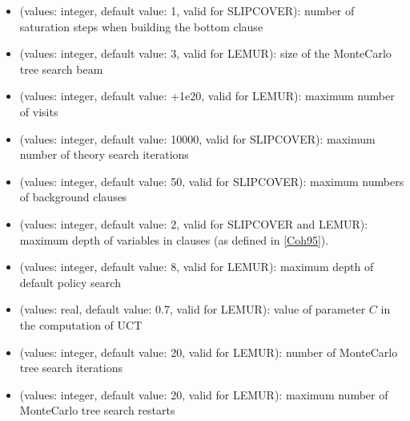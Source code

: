 \documentclass[letterpaper,10pt,english]{sphinxmanual}
\begin{document}
\begin{itemize}
\item {} 
\sphinxAtStartPar
{} (values: integer, default value: 1, valid for SLIPCOVER): number of saturation steps when building the bottom clause

\item {} 
\sphinxAtStartPar
{} (values: integer, default value: 3, valid for LEMUR): size of the Monte\sphinxhyphen{}Carlo tree search beam

\item {} 
\sphinxAtStartPar
{} (values: integer, default value: +1e20, valid for LEMUR): maximum number of visits

\item {} 
\sphinxAtStartPar
{} (values: integer, default value: 10000, valid for SLIPCOVER): maximum number of theory search iterations

\item {} 
\sphinxAtStartPar
{} (values: integer, default value: 50, valid for SLIPCOVER): maximum numbers of background clauses

\item {} 
\sphinxAtStartPar
{} (values: integer, default value: 2, valid for SLIPCOVER and LEMUR): maximum depth of variables in clauses (as defined in {[}\hyperlink{cite.index:id63}{Coh95}{]}).

\item {} 
\sphinxAtStartPar
{} (values: integer, default value: 8, valid for LEMUR): maximum depth of default policy search

\item {} 
\sphinxAtStartPar
{} (values: real, default value: 0.7, valid for LEMUR): value of parameter \(C\) in the computation of UCT

\item {} 
\sphinxAtStartPar
{} (values: integer, default value: 20, valid for LEMUR): number of Monte\sphinxhyphen{}Carlo tree search iterations

\item {} 
\sphinxAtStartPar
{} (values: integer, default value: 20, valid for LEMUR): maximum number of Monte\sphinxhyphen{}Carlo tree search restarts


\end{itemize}
\end{document}
